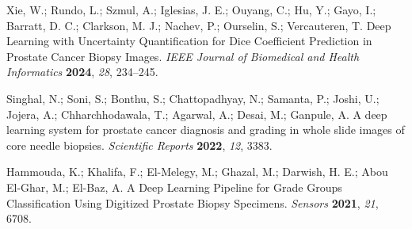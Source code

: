 Xie, W.; Rundo, L.; Szmul, A.; Iglesias, J. E.; Ouyang, C.; Hu, Y.; Gayo, I.; Barratt, D. C.; Clarkson, M. J.; Nachev, P.; Ourselin, S.; Vercauteren, T. Deep Learning with Uncertainty Quantification for Dice Coefficient Prediction in Prostate Cancer Biopsy Images. \textit{IEEE Journal of Biomedical and Health Informatics} \textbf{2024}, \textit{28}, 234--245.

Singhal, N.; Soni, S.; Bonthu, S.; Chattopadhyay, N.; Samanta, P.; Joshi, U.; Jojera, A.; Chharchhodawala, T.; Agarwal, A.; Desai, M.; Ganpule, A. A deep learning system for prostate cancer diagnosis and grading in whole slide images of core needle biopsies. \textit{Scientific Reports} \textbf{2022}, \textit{12}, 3383.

Hammouda, K.; Khalifa, F.; El-Melegy, M.; Ghazal, M.; Darwish, H. E.; Abou El-Ghar, M.; El-Baz, A. A Deep Learning Pipeline for Grade Groups Classification Using Digitized Prostate Biopsy Specimens. \textit{Sensors} \textbf{2021}, \textit{21}, 6708.
